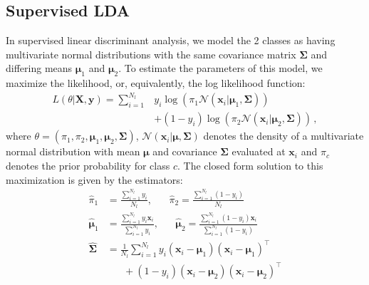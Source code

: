 \documentclass[twoside]{memoir}\usepackage[]{graphicx}\usepackage{xcolor}
\begin{document}
\subsection{Supervised LDA}
In supervised linear discriminant analysis, we model the 2 classes as having multivariate normal distributions with the same covariance matrix $\boldsymbol{\Sigma}$ and differing means $\boldsymbol{\mu}_1$ and $\boldsymbol{\mu}_2$. To estimate the parameters of this model, we maximize the likelihood, or, equivalently, the log likelihood function:
\begin{align}
\label{eq:lda}
L(\theta|\mathbf{X},\mathbf{y})= \sum_{i=1}^{N_l} & y_i \log(\pi_1 \mathcal{N}(\mathbf{x}_i|\boldsymbol{\mu}_1,\mathbf{\Sigma})) \nonumber \\
& +(1-y_i) \log(\pi_2 \mathcal{N}(\mathbf{x}_i|\boldsymbol{\mu}_2,\mathbf{\Sigma})) \,,
\end{align}
where $\theta=\left( \pi_1,\pi_2, \boldsymbol{\mu}_1,\boldsymbol{\mu}_2,\mathbf{\Sigma} \right)$, $\mathcal{N}(\mathbf{x}_i|\boldsymbol{\mu},\mathbf{\Sigma})$ denotes the density of a multivariate normal distribution with mean $\boldsymbol{\mu}$ and covariance $\mathbf{\Sigma}$ evaluated at $\mathbf{x}_i$ and $\pi_c$ denotes the prior probability for class $c$. The closed form solution to this maximization is given by the estimators:
\begin{align}
\label{eq:ldasolution}
\hat{\pi}_1 &= \frac{\sum_{i=1}^{N_l} y_i}{N_l}, \hspace{20pt} \hat{\pi}_2 = \frac{\sum_{i=1}^{N_l} (1-y_i)}{N_l}  \nonumber \\
\hat{\boldsymbol{\mu}}_1 &= \frac{\sum_{i=1}^{N_l} y_i \mathbf{x}_i}{\sum_{i=1}^{N_l} y_i}, \hspace{20pt} \hat{\boldsymbol{\mu}}_2 = \frac{\sum_{i=1}^{N_l} (1-y_i) \mathbf{x}_i}{\sum_{i=1}^{N_l} (1-y_i)}  \nonumber  \\
\hat{\mathbf{\Sigma}} &= \frac{1}{N_l} \sum_{i=1}^{N_l} y_i (\mathbf{x}_i-\boldsymbol{\mu}_1) (\mathbf{x}_i-\boldsymbol{\mu}_1)^\top  \nonumber \\
& \hspace{20pt} + (1-y_i) (\mathbf{x}_i-\boldsymbol{\mu}_2) (\mathbf{x}_i-\boldsymbol{\mu}_2)^\top 
\end{align}
\end{document}

